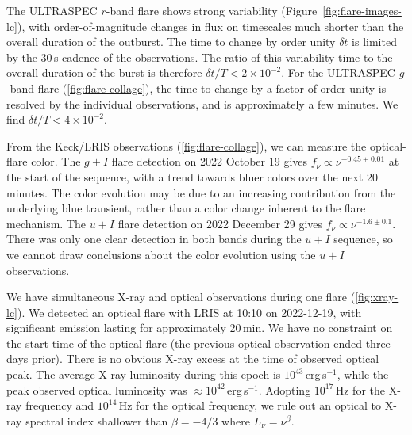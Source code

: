 \documentclass{nature_plusfigure}
\begin{document}
\begin{methods}
The ULTRASPEC $r$-band flare shows strong variability (Figure~\ref{fig:flare-images-lc}), with order-of-magnitude changes in flux on timescales much shorter than the overall duration of the outburst. The time to change by order unity $\delta t$ is limited by the 30\,s cadence of the observations. The ratio of this variability time to the overall duration of the burst is therefore $\delta t/T<2\times10^{-2}$. For the ULTRASPEC $g$-band flare (\ref{fig:flare-collage}), the time to change by a factor of order unity is resolved by the individual observations, and is approximately a few minutes. We find $\delta t/T<4\times10^{-2}$.

From the Keck/LRIS observations (\ref{fig:flare-collage}), we can measure the optical-flare color. The $g+I$ flare detection on 2022 October 19 gives $f_\nu \propto \nu^{-0.45\pm0.01}$ at the start of the sequence, with a trend towards bluer colors over the next 20 minutes. The color evolution may be due to an increasing contribution from the underlying blue transient, rather than a color change inherent to the flare mechanism.
The $u+I$ flare detection on 2022 December 29 gives $f_\nu \propto \nu^{-1.6\pm0.1}$. There was only one clear detection in both bands during the $u+I$ sequence, so we cannot draw conclusions about the color evolution using the $u+I$ observations. 

We have simultaneous X-ray and optical observations during one flare (\ref{fig:xray-lc}). We detected an optical flare with LRIS at 10:10 on 2022-12-19, with significant emission lasting for approximately 20\,min. We have no constraint on the start time of the optical flare (the previous optical observation ended three days prior). There is no obvious X-ray excess at the time of observed optical peak. The average X-ray luminosity during this epoch is $10^{43}\,$erg\,s$^{-1}$, while the peak observed optical luminosity was $\approx 10^{42}$\,erg\,s$^{-1}$.
Adopting $10^{17}\,$Hz for the X-ray frequency and $10^{14}\,$Hz for the optical frequency, we rule out an optical to X-ray spectral index shallower than $\beta=-4/3$ where $L_\nu = \nu^{\beta}$. 


\end{methods}
\end{document}
